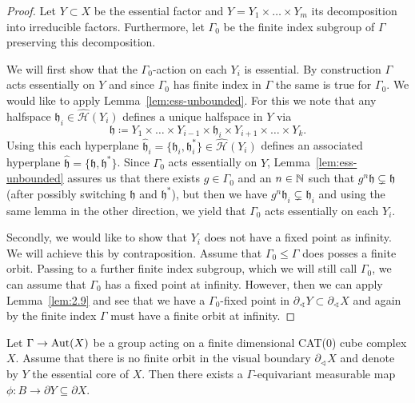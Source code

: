 \begin{proof}
  Let \(Y \subset X\) be the essential factor and \(Y = Y_1 \times \dots \times Y_m\) its decomposition into irreducible factors. Furthermore, let \(\Gamma_0\) be the finite index subgroup of \(\Gamma\) preserving this decomposition.

  We will first show that the \(\Gamma_0\)-action on each \(Y_i\) is essential. By construction \(\Gamma\) acts essentially on \(Y\) and since \(\Gamma_0\) has finite index in \(\Gamma\) the same is true for \(\Gamma_0\). We would like to apply Lemma~\ref{lem:ess-unbounded}. For this we note that any halfspace \(\mathfrak{h}_i \in \mathcal{\hat H}(Y_i)\) defines a unique halfspace in \(Y\) via
  \[
    \mathfrak{h} \coloneqq Y_1 \times \dots \times Y_{i-1} \times \mathfrak{h}_i \times Y_{i+1} \times \dots \times Y_k.
  \]
  Using this each hyperplane \(\mathfrak{\hat h}_i = \{\mathfrak{h}_i , \mathfrak{h}_i^\ast\} \in \mathcal{\hat H}(Y_i)\) defines an associated hyperplane \(\mathfrak{\hat h} = \{\mathfrak{h}, \mathfrak{h}^\ast\}\). Since \(\Gamma_0\) acts essentially on \(Y\), Lemma~\ref{lem:ess-unbounded} assures us that there exists \(g \in \Gamma_0\) and an \(n \in \mathbb{N}\) such that \(g^n \mathfrak{h} \subsetneq \mathfrak{h}\) (after possibly switching \(\mathfrak{h}\) and \(\mathfrak{h}^\ast\)), but then we have \(g^n \mathfrak{h}_i \subsetneq \mathfrak{h}_i\) and using the same lemma in the other direction, we yield that \(\Gamma_0\) acts essentially on each \(Y_i\).

  Secondly, we would like to show that \(Y_i\) does not have a fixed point as infinity. We will achieve this by contraposition. Assume that \(\Gamma_0 \leq \Gamma\) does posses a finite orbit. Passing to a further finite index subgroup, which we will still call \(\Gamma_0\), we can assume that \(\Gamma_0\) has a fixed point at infinity. However, then we can apply Lemma~\ref{lem:2.9} and see that we have a \(\Gamma_0\)-fixed point in \(\partial_\sphericalangle Y \subset \partial_\sphericalangle X\) and again by the finite index \(\Gamma\) must have a finite orbit at infinity.
\end{proof}

\begin{cor}[\cite{MR3509968}]
  Let \(\Gamma \to \operatorname{Aut}(X)\) be a group acting on a finite dimensional CAT(0) cube complex \(X\). Assume that there is no finite orbit in the visual boundary \(\partial_\sphericalangle X\) and denote by \(Y\) the essential core of \(X\). Then there exists a \(\Gamma\)-equivariant measurable map \(\phi \colon B \to \partial Y \subseteq \partial X\).
\end{cor}

